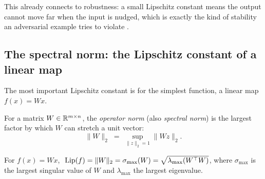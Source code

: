 This already connects to robustness: a small Lipschitz constant means the output cannot move far when the input is nudged, which is exactly the kind of stability an adversarial example tries to violate \citep{tsuzuku2018lipschitz}.

\subsection{The spectral norm: the Lipschitz constant of a linear map}
\label{sub:spectral}

The most important Lipschitz constant is for the simplest function, a linear map $f(x)=Wx$.

\begin{definition}
For a matrix $W\in\mathbb{R}^{m\times n}$, the \emph{operator norm} (also \emph{spectral norm}) is the largest factor by which $W$ can stretch a unit vector:
\[
  \|W\|_2 \;=\; \sup_{\|z\|_2 = 1} \|Wz\|_2 .
\]
\end{definition}

\begin{theorem}[Spectral norm $=$ Lipschitz constant of $x\mapsto Wx$]
\label{thm:spectral-lip}
For $f(x)=Wx$, $\ \Lip(f)=\|W\|_2=\sigma_{\max}(W)=\sqrt{\lambda_{\max}(W^\top W)}$, where $\sigma_{\max}$ is the largest singular value of $W$ and $\lambda_{\max}$ the largest eigenvalue.
\end{theorem}

